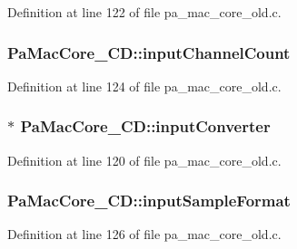 Definition at line 122 of file pa\+\_\+mac\+\_\+core\+\_\+old.\+c.

\subsubsection[{\texorpdfstring{input\+Channel\+Count}{inputChannelCount}}]{ Pa\+Mac\+Core\+\_\+\+C\+D\+::input\+Channel\+Count}\hypertarget{struct_pa_mac_core___c_d_a39c2b0bd092bfba57b3974cefccbf651}{}\label{struct_pa_mac_core___c_d_a39c2b0bd092bfba57b3974cefccbf651}


Definition at line 124 of file pa\+\_\+mac\+\_\+core\+\_\+old.\+c.

\subsubsection[{\texorpdfstring{input\+Converter}{inputConverter}}]{$\ast$ Pa\+Mac\+Core\+\_\+\+C\+D\+::input\+Converter}\hypertarget{struct_pa_mac_core___c_d_a4ebda9f740ce9930daa5938753e9ef3b}{}\label{struct_pa_mac_core___c_d_a4ebda9f740ce9930daa5938753e9ef3b}


Definition at line 120 of file pa\+\_\+mac\+\_\+core\+\_\+old.\+c.

\subsubsection[{\texorpdfstring{input\+Sample\+Format}{inputSampleFormat}}]{ Pa\+Mac\+Core\+\_\+\+C\+D\+::input\+Sample\+Format}\hypertarget{struct_pa_mac_core___c_d_a4f376ea13d81a8f38b70ddd750cc0930}{}\label{struct_pa_mac_core___c_d_a4f376ea13d81a8f38b70ddd750cc0930}


Definition at line 126 of file pa\+\_\+mac\+\_\+core\+\_\+old.\+c.

